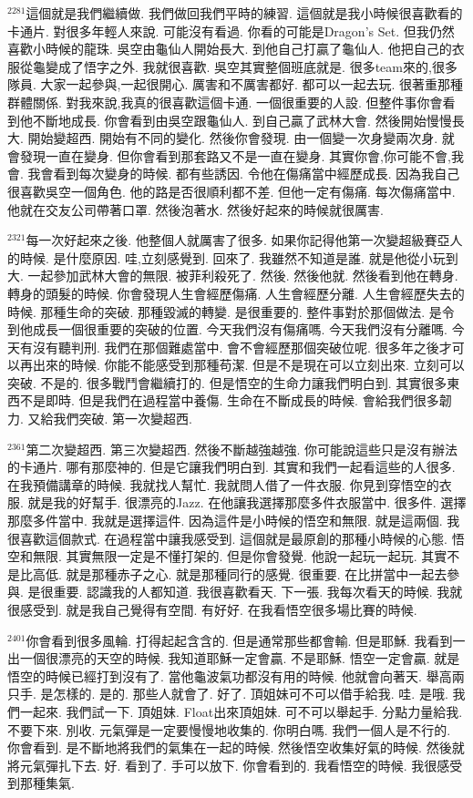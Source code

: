 \documentclass{book}
\begin{document}
$^{2281}$這個就是我們繼續做.
我們做回我們平時的練習.
這個就是我小時候很喜歡看的卡通片.
對很多年輕人來說.
可能沒有看過.
你看的可能是Dragon's Set.
但我仍然喜歡小時候的龍珠.
吳空由龜仙人開始長大.
到他自己打贏了龜仙人.
他把自己的衣服從龜變成了悟字之外.
我就很喜歡.
吳空其實整個班底就是.
很多team來的,很多隊員.
大家一起參與,一起很開心.
厲害和不厲害都好.
都可以一起去玩.
很著重那種群體關係.
對我來說,我真的很喜歡這個卡通.
一個很重要的人設.
但整件事你會看到他不斷地成長.
你會看到由吳空跟龜仙人.
到自己贏了武林大會.
然後開始慢慢長大.
開始變超西.
開始有不同的變化.
然後你會發現.
由一個變一次身變兩次身.
就會發現一直在變身.
但你會看到那套路又不是一直在變身.
其實你會,你可能不會,我會.
我會看到每次變身的時候.
都有些誘因.
令他在傷痛當中經歷成長.
因為我自己很喜歡吳空一個角色.
他的路是否很順利都不差.
但他一定有傷痛.
每次傷痛當中.
他就在交友公司帶著口罩.
然後泡著水.
然後好起來的時候就很厲害.

$^{2321}$每一次好起來之後.
他整個人就厲害了很多.
如果你記得他第一次變超級賽亞人的時候.
是什麼原因.
哇,立刻感覺到.
回來了.
我雖然不知道是誰.
就是他從小玩到大.
一起參加武林大會的無限.
被菲利殺死了.
然後.
然後他就.
然後看到他在轉身.
轉身的頭髮的時候.
你會發現人生會經歷傷痛.
人生會經歷分離.
人生會經歷失去的時候.
那種生命的突破.
那種毀滅的轉變.
是很重要的.
整件事對於那個做法.
是令到他成長一個很重要的突破的位置.
今天我們沒有傷痛嗎.
今天我們沒有分離嗎.
今天有沒有聽判刑.
我們在那個難處當中.
會不會經歷那個突破位呢.
很多年之後才可以再出來的時候.
你能不能感受到那種苟潔.
但是不是現在可以立刻出來.
立刻可以突破.
不是的.
很多戰鬥會繼續打的.
但是悟空的生命力讓我們明白到.
其實很多東西不是即時.
但是我們在過程當中養傷.
生命在不斷成長的時候.
會給我們很多韌力.
又給我們突破.
第一次變超西.

$^{2361}$第二次變超西.
第三次變超西.
然後不斷越強越強.
你可能說這些只是沒有辦法的卡通片.
哪有那麼神的.
但是它讓我們明白到.
其實和我們一起看這些的人很多.
在我預備講章的時候.
我就找人幫忙.
我就問人借了一件衣服.
你見到穿悟空的衣服.
就是我的好幫手.
很漂亮的Jazz.
在他讓我選擇那麼多件衣服當中.
很多件.
選擇那麼多件當中.
我就是選擇這件.
因為這件是小時候的悟空和無限.
就是這兩個.
我很喜歡這個款式.
在過程當中讓我感受到.
這個就是最原創的那種小時候的心態.
悟空和無限.
其實無限一定是不懂打架的.
但是你會發覺.
他說一起玩一起玩.
其實不是比高低.
就是那種赤子之心.
就是那種同行的感覺.
很重要.
在比拼當中一起去參與.
是很重要.
認識我的人都知道.
我很喜歡看天.
下一張.
我每次看天的時候.
我就很感受到.
就是我自己覺得有空間.
有好好.
在我看悟空很多場比賽的時候.

$^{2401}$你會看到很多風輪.
打得起起含含的.
但是通常那些都會輸.
但是耶穌.
我看到一出一個很漂亮的天空的時候.
我知道耶穌一定會贏.
不是耶穌.
悟空一定會贏.
就是悟空的時候已經打到沒有了.
當他龜波氣功都沒有用的時候.
他就會向著天.
舉高兩只手.
是怎樣的.
是的.
那些人就會了.
好了.
頂姐妹可不可以借手給我.
哇.
是哦.
我們一起來.
我們試一下.
頂姐妹.
Float出來頂姐妹.
可不可以舉起手.
分點力量給我.
不要下來.
別收.
元氣彈是一定要慢慢地收集的.
你明白嗎.
我們一個人是不行的.
你會看到.
是不斷地將我們的氣集在一起的時候.
然後悟空收集好氣的時候.
然後就將元氣彈扎下去.
好.
看到了.
手可以放下.
你會看到的.
我看悟空的時候.
我很感受到那種集氣.
\end{document}
